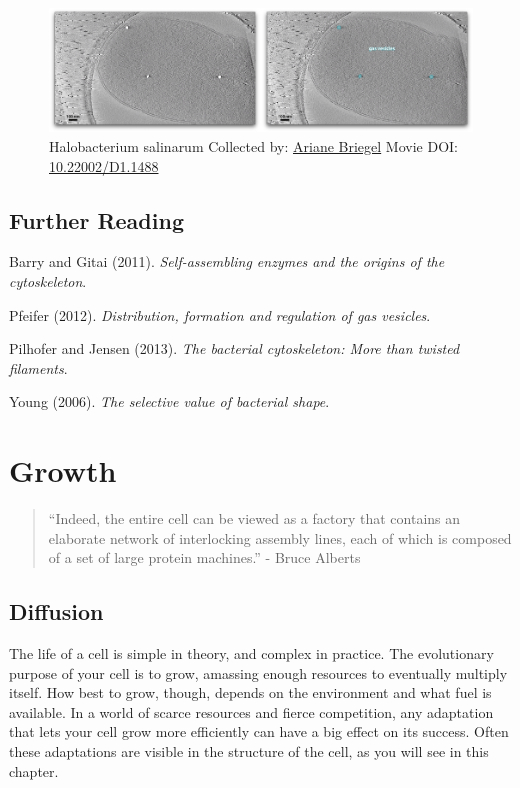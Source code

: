 \documentclass[]{tufte-book}
\begin{document}
\begin{figure}
\includegraphics{movie_stills/3_7a} \caption[Halobacterium salinarum Collected by:
\protect\hyperlink{ariane_briegel}{Ariane Briegel} Movie DOI:
\href{https://doi.org/10.22002/D1.1488}{10.22002/D1.1488}]{Halobacterium salinarum Collected by:
\protect\hyperlink{ariane_briegel}{Ariane Briegel} Movie DOI:
\href{https://doi.org/10.22002/D1.1488}{10.22002/D1.1488}}\label{fig:3-7a}
\end{figure}

\section{Further Reading}\label{further-reading}

Barry and Gitai (2011). \emph{Self-assembling enzymes and the origins of
the cytoskeleton}.\citep{barry2011}

Pfeifer (2012). \emph{Distribution, formation and regulation of gas
vesicles}.\citep{pfeifer2012}

Pilhofer and Jensen (2013). \emph{The bacterial cytoskeleton: More than
twisted filaments}.\citep{pilhofer2013}

Young (2006). \emph{The selective value of bacterial
shape}.\citep{young2006}

\chapter{Growth}\label{growth}

\begin{quote}
``Indeed, the entire cell can be viewed as a factory that contains an
elaborate network of interlocking assembly lines, each of which is
composed of a set of large protein machines.'' - Bruce Alberts
\citep{alberts1998}
\end{quote}

\section{Diffusion}\label{diffusion}

The life of a cell is simple in theory, and complex in practice. The
evolutionary purpose of your cell is to grow, amassing enough resources
to eventually multiply itself. How best to grow, though, depends on the
environment and what fuel is available. In a world of scarce resources
and fierce competition, any adaptation that lets your cell grow more
efficiently can have a big effect on its success. Often these
adaptations are visible in the structure of the cell, as you will see in
this chapter.
\end{document}
